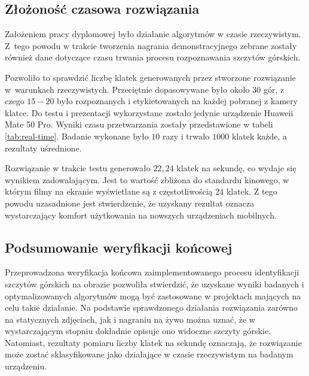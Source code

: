 \subsection{Złożoność czasowa rozwiązania}

Założeniem pracy dyplomowej było działanie algorytmów w czasie rzeczywistym. Z~tego powodu w trakcie tworzenia nagrania demonstracyjnego zebrane zostały również dane dotyczące czasu trwania procesu rozpoznawania szczytów górskich.

Pozwoliło to sprawdzić liczbę klatek generowanych przez stworzone rozwiązanie w~warunkach rzeczywistych. Przeciętnie dopasowywane było około $30$ gór, z czego $15-20$ było rozpoznanych i etykietowanych  na każdej pobranej z kamery klatce. Do testu i prezentacji wykorzystane zostało jedynie urządzenie Huaweii Mate 50 Pro. Wyniki czasu przetwarzania zostały przedstawione w tabeli \ref{tab:real-time}. Badanie wykonane było $10$ razy i trwało $1000$ klatek każde, a rezultaty uśrednione.



Rozwiązanie w trakcie testu generowało $22,24$ klatek na sekundę, co wydaje się wynikiem zadowalającym. Jest to wartość zbliżona do standardu kinowego, w którym filmy na ekranie wyświetlane są z częstotliwością $24$ klatek. Z tego powodu uzasadnione jest stwierdzenie, że uzyskany rezultat oznacza wystarczający komfort użytkowania na nowszych urządzeniach mobilnych.




\subsection{Podsumowanie weryfikacji końcowej}

Przeprowadzona weryfikacja końcowa zaimplementowanego procesu identyfikacji szczytów górskich na obrazie pozwoliła stwierdzić, że uzyskane wyniki badanych i optymalizowanych algorytmów mogą być zastosowane w projektach mających na celu takie działanie. Na podstawie sprawdzonego działania rozwiązania zarówno na statycznych zdjęciach, jak i nagraniu na żywo można uznać, że w wystarczającym stopniu dokładnie opisuje ono widoczne szczyty górskie. Natomiast, rezultaty pomiaru liczby klatek na sekundę oznaczają, że rozwiązanie może zostać sklasyfikowane jako działające w czasie rzeczywistym na badanym urządzeniu.